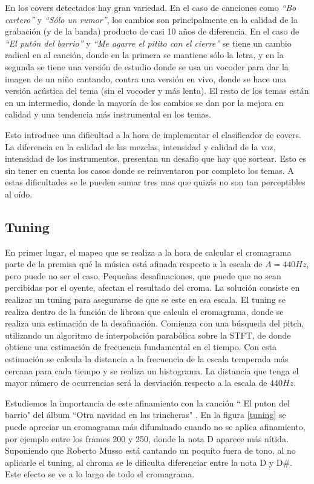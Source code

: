 \documentclass{article}
\begin{document}
En los covers detectados hay gran variedad. En el caso de canciones como \textit{``Bo cartero''} y \textit{``Sólo un rumor''}, los cambios son principalmente en la calidad de la grabación (y de la banda) producto de casi 10 años de diferencia. En el caso de \textit{``El putón del barrio''} y \textit{``Me agarre el pitito con el cierre''} se tiene un cambio radical en al canción, donde en la primera se mantiene sólo la letra, y en la segunda se tiene una versión de estudio donde se usa un vocoder para dar la imagen de un niño cantando, contra una versión en vivo, donde se hace una versión acústica del tema (sin el vocoder y más lenta). El resto de los temas están en un intermedio, donde la mayoría de los cambios se dan por la mejora en calidad y una tendencia más instrumental en los temas.

Esto introduce una dificultad a la hora de implementar el clasificador de covers. La diferencia en la calidad de las mezclas, intensidad y calidad de la voz, intensidad de los instrumentos, presentan un desafío que hay que sortear. Esto es sin tener en cuenta los casos donde se reinventaron por completo los temas. A estas dificultades se le pueden sumar tres mas que quizás no son tan perceptibles al oído. 

\subsection{Tuning}

En primer lugar, el mapeo que se realiza a la hora de calcular el cromagrama parte de la premisa qué la música está afinada respecto a la escala de $A=440Hz$, pero puede no ser el caso. Pequeñas desafinaciones, que puede que no sean percibidas por el oyente, afectan el resultado del croma. La solución consiste en realizar un tuning para asegurarse de que se este en esa escala. El tuning se realiza dentro de la función de librosa que calcula el cromagrama, donde se realiza una estimación de la desafinación. Comienza con una búsqueda del pitch, utilizando un algoritmo de interpolación parabólica sobre la STFT, de donde obtiene una estimación de frecuencia fundamental en el tiempo. Con esta estimación se calcula la distancia a la frecuencia de la escala temperada más cercana para cada tiempo y se realiza un histograma. La distancia que tenga el mayor número de ocurrencias será la desviación respecto a la escala de $440Hz$.

Estudiemos la importancia de este afinamiento con la canción `` El puton del barrio" del álbum  ``Otra navidad en las trincheras" . En la figura \ref{tuning} se puede apreciar un cromagrama más difuminado cuando no se aplica afinamiento, por ejemplo entre los frames 200 y 250, donde la nota D aparece más nítida. Suponiendo que Roberto Musso está cantando un poquito fuera de tono, al no aplicarle el tuning, al chroma se le dificulta diferenciar entre la nota D y D\#. Este efecto se ve a lo largo de todo el cromagrama.
\end{document}
